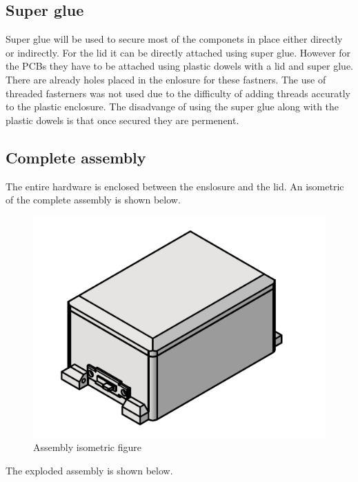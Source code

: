 \documentclass[12pt, titlepage]{article}
\begin{document}
\subsection{Super glue}
Super glue will be used to secure most of the componets in place either directly or indirectly. For the lid it can be directly attached using super glue. However for the PCBs they have to be attached using plastic dowels with a lid and super glue. There are already holes placed in the enlosure for these fastners. The use of threaded fasterners was not used due to the difficulty of adding threads accuratly to the plastic enclosure. The disadvange of using the super glue along with the plastic dowels is that once secured they are permenent.   

\subsection{Complete assembly}
The entire hardware is enclosed between the enslosure and the lid. An isometric of the complete assembly is shown below. \\
\begin{figure}[H]
  \vspace*{-0.75cm}
  \centering
  \includegraphics[width=\textwidth,height=\textheight/2,keepaspectratio]{Assembly_ISO.png}
  \caption{Assembly isometric figure}
  \label{Assembly ISO} 
\end{figure}
\noindent The exploded assembly is shown below. \\
\end{document}
